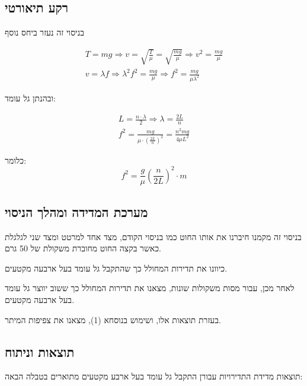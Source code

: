 \documentclass[14pt]{extarticle}
\begin{document}
\subsection*{רקע תיאורטי}
בניסוי זה נעזר ביחס נוסף
\begin{center}
    \begin{equation*}
        \begin{aligned}
            T=mg \Rightarrow v = \sqrt{\frac{T}{\mu}} = \sqrt{\frac{mg}{\mu}} \Rightarrow v^2 = \frac{mg}{\mu} \\
            v=\lambda f \Rightarrow \lambda^2 f^2 = \frac{mg}{\mu} \Rightarrow f^2 = \frac{mg}{\mu \lambda^2}
        \end{aligned}
    \end{equation*}
\end{center}
ובהנתן גל עומד:
\begin{center}
    \begin{equation*}
        \begin{aligned}
            L=\frac{n \cdot \lambda}{2} \Rightarrow \lambda = \frac{2L}{n} \\
            f^2 = \frac{mg}{\mu \cdot (\frac{2L}{n})^2} = \frac{n^2 mg}{4 \mu L^2}
        \end{aligned}
    \end{equation*}
\end{center}
כלומר:
\begin{equation}
    f^2 = \frac{g}{\mu} (\frac{n}{2L})^2 \cdot m
\end{equation}

\subsection*{מערכת המדידה ומהלך הניסוי}
בניסוי זה מקמנו חיברנו את אותו החוט כמו בניסוי הקודם, מצד אחד למרטט ומצד שני לגלגלת כאשר בקצה החוט מחוברת משקולת של 50 גרם.

כיוונו את תדירות המחולל כך שהתקבל גל עומד בעל ארבעה מקטעים.

לאחר מכן, עבור מסות משקולות שונות, מצאנו את תדירות המחולל כך ששוב יווצר גל עומד בעל ארבעה מקטעים.

בעזרת תוצאות אלו, ושימוש בנוסחא (1), מצאנו את צפיפות המיתר.

\subsection*{תוצאות וניתוח}
תוצאות מדידת התדירויות עבורן התקבל גל עומד בעל ארבע מקטעים מתוארים בטבלה הבאה:
\end{document}
